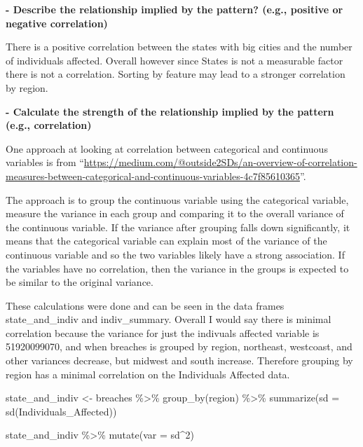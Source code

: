 \documentclass[
]{article}
\newenvironment{Shaded}{\begin{snugshade}}{\end{snugshade}}
\newcommand{\AttributeTok}[1]{\textcolor[rgb]{0.77,0.63,0.00}{#1}}
\newcommand{\DecValTok}[1]{\textcolor[rgb]{0.00,0.00,0.81}{#1}}
\newcommand{\FunctionTok}[1]{\textcolor[rgb]{0.00,0.00,0.00}{#1}}
\newcommand{\NormalTok}[1]{#1}
\newcommand{\OtherTok}[1]{\textcolor[rgb]{0.56,0.35,0.01}{#1}}
\newcommand{\SpecialCharTok}[1]{\textcolor[rgb]{0.00,0.00,0.00}{#1}}
\begin{document}
\textbf{- Describe the relationship implied by the pattern? (e.g.,
positive or negative correlation)}

There is a positive correlation between the states with big cities and
the number of individuals affected. Overall however since States is not
a measurable factor there is not a correlation. Sorting by feature may
lead to a stronger correlation by region.

\textbf{- Calculate the strength of the relationship implied by the
pattern (e.g., correlation)}

One approach at looking at correlation between categorical and
continuous variables is from
``\url{https://medium.com/@outside2SDs/an-overview-of-correlation-measures-between-categorical-and-continuous-variables-4c7f85610365}''.

The approach is to group the continuous variable using the categorical
variable, measure the variance in each group and comparing it to the
overall variance of the continuous variable. If the variance after
grouping falls down significantly, it means that the categorical
variable can explain most of the variance of the continuous variable and
so the two variables likely have a strong association. If the variables
have no correlation, then the variance in the groups is expected to be
similar to the original variance.

These calculations were done and can be seen in the data frames
state\_and\_indiv and indiv\_summary. Overall I would say there is
minimal correlation because the variance for just the indivuals affected
variable is 51920099070, and when breaches is grouped by region,
northeast, westcoast, and other variances decrease, but midwest and
south increase. Therefore grouping by region has a minimal correlation
on the Individuals Affected data.

\begin{Shaded}
\begin{Highlighting}[]
\NormalTok{state\_and\_indiv }\OtherTok{\textless{}{-}}\NormalTok{ breaches }\SpecialCharTok{\%\textgreater{}\%}
  \FunctionTok{group\_by}\NormalTok{(region) }\SpecialCharTok{\%\textgreater{}\%}
  \FunctionTok{summarize}\NormalTok{(}\AttributeTok{sd =} \FunctionTok{sd}\NormalTok{(Individuals\_Affected))}

\NormalTok{state\_and\_indiv }\SpecialCharTok{\%\textgreater{}\%}
  \FunctionTok{mutate}\NormalTok{(}\AttributeTok{var =}\NormalTok{ sd}\SpecialCharTok{\^{}}\DecValTok{2}\NormalTok{)}
\end{Highlighting}
\end{Shaded}
\end{document}
